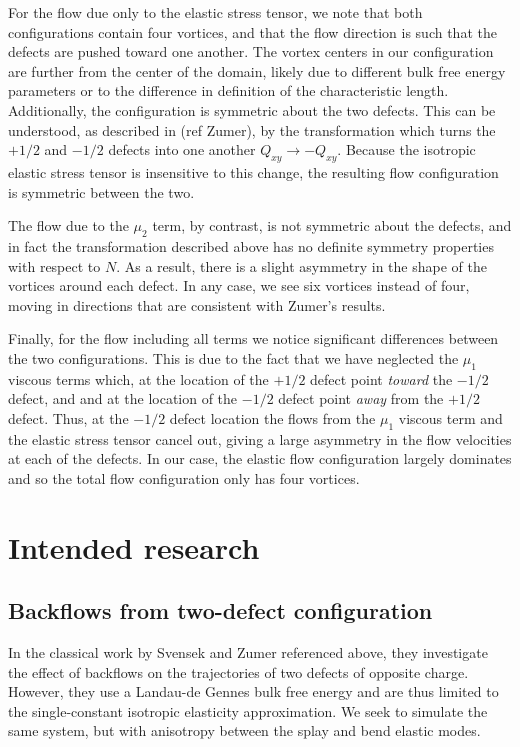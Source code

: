 \documentclass[reqno]{article}
\begin{document}
  For the flow due only to the elastic stress tensor, we note that both
  configurations contain four vortices, and that the flow direction is such that
  the defects are pushed toward one another.
  The vortex centers in our configuration are further from the center of the
  domain, likely due to different bulk free energy parameters or to the
  difference in definition of the characteristic length.
  Additionally, the configuration is symmetric about the two defects.
  This can be understood, as described in (ref Zumer), by the transformation
  which turns the $+1/2$ and $-1/2$ defects into one another $Q_{xy} \to
  -Q_{xy}$.
  Because the isotropic elastic stress tensor is insensitive to this change, the
  resulting flow configuration is symmetric between the two.

  The flow due to the $\mu_2$ term, by contrast, is not symmetric about the
  defects, and in fact the transformation described above has no definite
  symmetry properties with respect to $N$.
  As a result, there is a slight asymmetry in the shape of the vortices around
  each defect.
  In any case, we see six vortices instead of four, moving in directions that
  are consistent with Zumer's results.

  Finally, for the flow including all terms we notice significant differences
  between the two configurations.
  This is due to the fact that we have neglected the $\mu_1$ viscous terms
  which, at the location of the $+1/2$ defect point \textit{toward} the $-1/2$ defect,
  and and at the location of the $-1/2$ defect point \textit{away} from the
  $+1/2$ defect.
  Thus, at the $-1/2$ defect location the flows from the $\mu_1$ viscous term
  and the elastic stress tensor cancel out, giving a large asymmetry in the flow
  velocities at each of the defects.
  In our case, the elastic flow configuration largely dominates and so the total
  flow configuration only has four vortices.

  \section{Intended research}
  \subsection{Backflows from two-defect configuration}
  In the classical work by Svensek and Zumer referenced above, they investigate
  the effect of backflows on the trajectories of two defects of opposite charge.
  However, they use a Landau-de Gennes bulk free energy and are thus limited to
  the single-constant isotropic elasticity approximation.
  We seek to simulate the same system, but with anisotropy between the splay and
  bend elastic modes.
  
\end{document}
